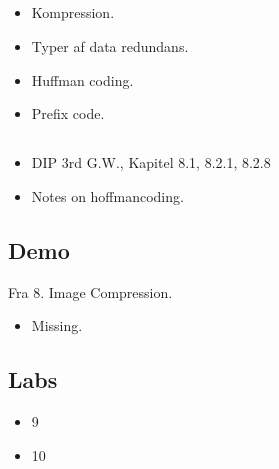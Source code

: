 \subsection{\subtopics}

\begin{itemize}
	\item Kompression.
	\item Typer af data redundans.
	\item Huffman coding.
	\item Prefix code.
\end{itemize}

\subsection{\curriculum}

\begin{itemize}
	\item DIP 3rd G.W., Kapitel 8.1, 8.2.1, 8.2.8
	\item Notes on hoffmancoding.
\end{itemize}

\subsection{Demo}

Fra 8. Image Compression.

\begin{itemize}
	\item Missing.
\end{itemize}

\subsection{Labs}

\begin{itemize}
	\item 9
	\item 10
\end{itemize}
